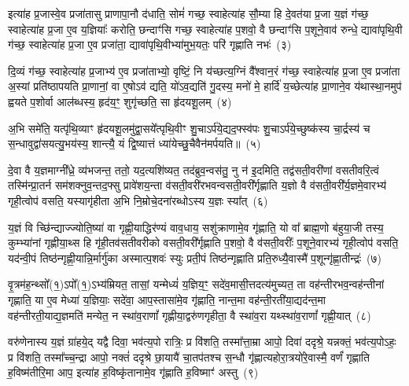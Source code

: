 इत्या॑ह प्र॒जास्वे॒व प्रजा॑तासु प्राणापा॒नौ द॑धाति॒ सोमं॑ गच्छ॒ स्वाहेत्या॑ह सौ॒म्या हि दे॒वत॑या प्र॒जा य॒ज्ञं ग॑च्छ॒ स्वाहेत्या॑ह प्र॒जा ए॒व य॒ज्ञियाः᳚ करोति॒ छन्दाꣳ॑सि गच्छ॒ स्वाहेत्या॑ह प॒शवो॒ वै छन्दाꣳ॑सि प॒शूने॒वाव॑ रुन्धे॒ द्यावा॑\-पृथि॒वी ग॑च्छ॒ स्वाहेत्या॑ह प्र॒जा ए॒व प्रजा॑ता॒ द्यावा॑\-पृथि॒वीभ्या॑मुभ॒यतः॒ परि॑ गृह्णाति नभः॑~(३)\ip

दि॒व्यं ग॑च्छ॒ स्वाहेत्या॑ह प्र॒जाभ्य॑ ए॒व प्रजा॑ताभ्यो॒ वृष्टिं॒ नि य॑च्छत्य॒ग्निं वै᳚श्वान॒रं ग॑च्छ॒ स्वाहेत्या॑ह प्र॒जा ए॒व प्रजा॑ता अ॒स्यां प्रति॑\-ष्ठापयति प्रा॒णानां॒ वा ए॒षो\-ऽव॑ द्यति॒ यो॑\-ऽव॒द्यति॑ गु॒दस्य॒ मनो॑ मे॒ हार्दि॑ य॒च्छेत्या॑ह प्रा॒णाने॒व य॑थास्था॒नमुप॑ ह्वयते प॒शोर्वा आल॑ब्धस्य॒ हृद॑य॒ꣳ॒ शुगृ॑च्छति॒ सा हृ॑दयशू॒लम्~(४)\ip

अ॒भि समे॑ति॒ यत्पृ॑थि॒व्याꣳ हृ॑दयशू॒लमु॑द्वा॒सये᳚त्पृथि॒वीꣳ शु॒चा\-ऽर्प॑ये॒द्यद॒फ्स्व॑पः शु॒चा\-ऽर्प॑ये॒च्छुष्क॑स्य चा॒र्द्रस्य॑ च स॒न्धावुद्वा॑सयत्यु॒भय॑स्य॒ शान्त्यै॒ यं द्वि॒ष्यात्तं ध्या॑येच्छु॒चैवैन॑मर्पयति॥~(५)\ip

{\anuvakamend[{रेतो॑ मि॒त्रावरु॑णौ गच्छ॒ स्वाहा॒ नभो॑ हृदयशू॒लं द्वात्रिꣳ॑शच्च}]}

दे॒वा वै य॒ज्ञमाग्नी᳚ध्रे॒ व्य॑भजन्त॒ ततो॒ यद॒त्यशि॑ष्यत॒ तद॑ब्रुव॒न्वस॑तु॒ नु न॑ इ॒दमिति॒ तद्व॑सती॒वरी॑णां वसतीवरि॒त्वं तस्मि॑न्प्रा॒तर्न सम॑शक्नुव॒न्तद॒फ्सु प्रावे॑शय॒न्ता व॑सती॒वरी॑रभवन्वसती॒वरी᳚र्गृह्णाति य॒ज्ञो वै व॑सती॒वरी᳚र्य॒ज्ञमे॒वारभ्य॑ गृही॒त्वोप॑ वसति॒ यस्यागृ॑हीता अ॒भि नि॒म्रोचे॒दना॑रब्धो\-ऽस्य य॒ज्ञः स्या᳚त्~(६)\ip

य॒ज्ञं वि च्छि॑न्द्याज्ज्योति॒ष्या॑ वा गृह्णी॒याद्धिर॑ण्यं वाव॒धाय॒ सशु॑क्राणामे॒व गृ॑ह्णाति॒ यो वा᳚ ब्राह्म॒णो ब॑हुया॒जी तस्य॒ कुम्भ्या॑नां गृह्णीया॒थ्स हि गृ॑ही॒तव॑सतीवरीको वसती॒वरी᳚र्गृह्णाति प॒शवो॒ वै व॑सती॒वरीः᳚ प॒शूने॒वारभ्य॑ गृही॒त्वोप॑ वसति॒ यद॑न्वी॒पं तिष्ठ॑न्गृह्णी॒यान्नि॒र्मार्गु॑का अस्मात्प॒शवः॑ स्युः प्रती॒पं तिष्ठ॑न्गृह्णाति प्रति॒रुध्यै॒वास्मै॑ प॒शून्गृ॑ह्णा॒तीन्द्रः॑~(७)\ip

वृ॒त्रम॑ह॒न्थ्सो᳚(१॒)\-ऽपो᳚(१॒)\-ऽभ्य॑म्रियत॒ तासां॒ यन्मेध्यं॑ य॒ज्ञिय॒ꣳ॒ सदे॑व॒मासी॒त्तदत्य॑मुच्यत॒ ता वह॑न्तीरभव॒न्वह॑न्तीनां गृह्णाति॒ या ए॒व मेध्या॑ य॒ज्ञियाः॒ सदे॑वा॒ आप॒स्तासा॑मे॒व गृ॑ह्णाति॒ नान्त॒मा वह॑न्ती॒रती॑या॒द्यद॑न्त॒मा वह॑न्तीरती॒याद्य॒ज्ञमति॑ मन्येत॒ न स्था॑व॒राणां᳚ गृह्णीया॒द्वरु॑णगृहीता॒ वै स्था॑व॒रा यथ्स्था॑व॒राणां᳚ गृह्णी॒यात्~(८)\ip

वरु॑णेनास्य य॒ज्ञं ग्रा॑हये॒द् यद्वै दिवा॒ भव॑त्य॒पो रात्रिः॒ प्र वि॑शति॒ तस्मा᳚त्ता॒म्रा आपो॒ दिवा॑ ददृश्रे॒ यन्नक्तं॒ भव॑त्य॒पो\-ऽहः॒ प्र वि॑शति॒ तस्मा᳚च्च॒न्द्रा आपो॒ नक्तं॑ ददृश्रे छा॒यायै॑ चा॒तप॑तश्च स॒न्धौ गृ॑ह्णात्यहोरा॒त्रयो॑रे॒वास्मै॒ वर्णं॑ गृह्णाति ह॒विष्म॑तीरि॒मा आप॒ इत्या॑ह ह॒विष्कृ॑तानामे॒व गृ॑ह्णाति ह॒विष्माꣳ॑ अस्तु~(९)\ip

